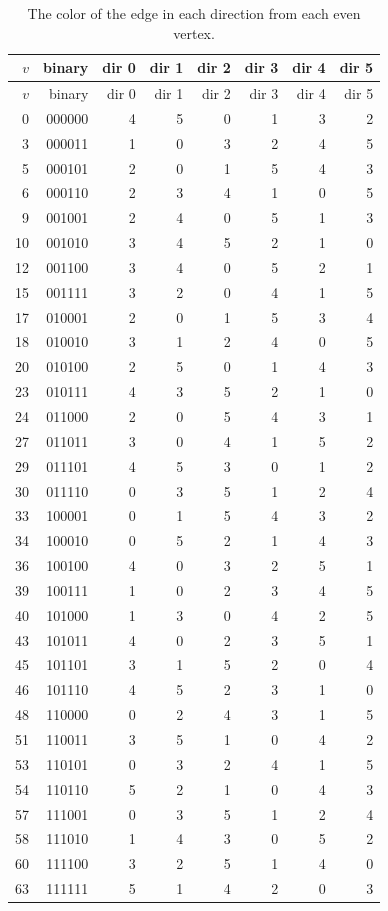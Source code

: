 \documentclass[preprint,12pt]{elsarticle}
\begin{document}
\begin{longtable}{rrrrrrrr}
\caption{The color of the edge in each direction from each even vertex.}
\label{tab:coloring}\\
\toprule
\(v\) & binary & dir 0 & dir 1 & dir 2 & dir 3 & dir 4 & dir 5 \\
\midrule
\endfirsthead
\toprule
\(v\) & binary & dir 0 & dir 1 & dir 2 & dir 3 & dir 4 & dir 5 \\
\midrule
\endhead
0  & 000000 & 4 & 5 & 0 & 1 & 3 & 2 \\
3  & 000011 & 1 & 0 & 3 & 2 & 4 & 5 \\
5  & 000101 & 2 & 0 & 1 & 5 & 4 & 3 \\
6  & 000110 & 2 & 3 & 4 & 1 & 0 & 5 \\
9  & 001001 & 2 & 4 & 0 & 5 & 1 & 3 \\
10 & 001010 & 3 & 4 & 5 & 2 & 1 & 0 \\
12 & 001100 & 3 & 4 & 0 & 5 & 2 & 1 \\
15 & 001111 & 3 & 2 & 0 & 4 & 1 & 5 \\
17 & 010001 & 2 & 0 & 1 & 5 & 3 & 4 \\
18 & 010010 & 3 & 1 & 2 & 4 & 0 & 5 \\
20 & 010100 & 2 & 5 & 0 & 1 & 4 & 3 \\
23 & 010111 & 4 & 3 & 5 & 2 & 1 & 0 \\
24 & 011000 & 2 & 0 & 5 & 4 & 3 & 1 \\
27 & 011011 & 3 & 0 & 4 & 1 & 5 & 2 \\
29 & 011101 & 4 & 5 & 3 & 0 & 1 & 2 \\
30 & 011110 & 0 & 3 & 5 & 1 & 2 & 4 \\
33 & 100001 & 0 & 1 & 5 & 4 & 3 & 2 \\
34 & 100010 & 0 & 5 & 2 & 1 & 4 & 3 \\
36 & 100100 & 4 & 0 & 3 & 2 & 5 & 1 \\
39 & 100111 & 1 & 0 & 2 & 3 & 4 & 5 \\
40 & 101000 & 1 & 3 & 0 & 4 & 2 & 5 \\
43 & 101011 & 4 & 0 & 2 & 3 & 5 & 1 \\
45 & 101101 & 3 & 1 & 5 & 2 & 0 & 4 \\
46 & 101110 & 4 & 5 & 2 & 3 & 1 & 0 \\
48 & 110000 & 0 & 2 & 4 & 3 & 1 & 5 \\
51 & 110011 & 3 & 5 & 1 & 0 & 4 & 2 \\
53 & 110101 & 0 & 3 & 2 & 4 & 1 & 5 \\
54 & 110110 & 5 & 2 & 1 & 0 & 4 & 3 \\
57 & 111001 & 0 & 3 & 5 & 1 & 2 & 4 \\
58 & 111010 & 1 & 4 & 3 & 0 & 5 & 2 \\
60 & 111100 & 3 & 2 & 5 & 1 & 4 & 0 \\
63 & 111111 & 5 & 1 & 4 & 2 & 0 & 3 \\
\bottomrule
\end{longtable}
\end{document}
